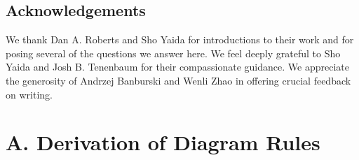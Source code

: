 \documentclass{article}
\begin{document}

\subsection{Acknowledgements}
    We thank Dan A. Roberts and Sho Yaida for introductions to their work and
    for posing several of the questions we answer here.  We feel deeply
    grateful to Sho Yaida and Josh B. Tenenbaum for their compassionate
    guidance.  We appreciate the generosity of
        Andrzej Banburski
        and
        Wenli Zhao
    in offering crucial feedback on writing.


    
    


\section*{A. Derivation of Diagram Rules}
\end{document}
